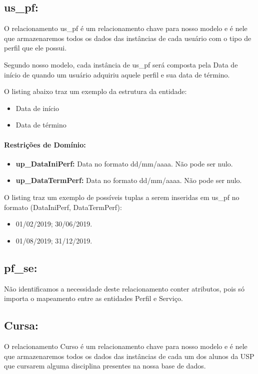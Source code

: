 \documentclass{report}
\begin{document}
\subsection{us\_pf:}
O relacionamento us\_pf é um relacionamento chave para nosso modelo e é nele que armazenaremos todos os dados das instâncias de cada usuário com o tipo de perfil que ele possui.
	
	Segundo nosso modelo, cada instância de us\_pf será composta pela Data de início de quando um usuário adquiriu aquele perfil e sua data de término.	
	
	O listing abaixo traz um exemplo da estrutura da entidade:
\begin{itemize}
  \item Data de início
  \item Data de término
\end{itemize}
\paragraph{Restrições de Domínio:}
\begin{itemize}
  \item \textbf{up\_DataIniPerf:} Data no formato dd/mm/aaaa. Não pode ser nulo.
  \item \textbf{up\_DataTermPerf:} Data no formato dd/mm/aaaa. Não pode ser nulo.
\end{itemize}
O listing traz um exemplo de possíveis tuplas a serem inseridas em us\_pf no formato (DataIniPerf, DataTermPerf):

\begin{itemize}
	\item 01/02/2019; 30/06/2019.
	\item 01/08/2019; 31/12/2019.
\end{itemize}
 \subsection{pf\_se:}
Não identificamos a necessidade deste relacionamento conter atributos, pois só
 importa o mapeamento entre as entidades Perfil e Serviço.
\subsection{Cursa:}
O relacionamento Curso é um relacionamento chave para nosso modelo e é nele que armazenaremos todos os dados das instâncias de cada um dos alunos da USP que cursarem alguma disciplina presentes na nossa base de dados.
	
\end{document}
